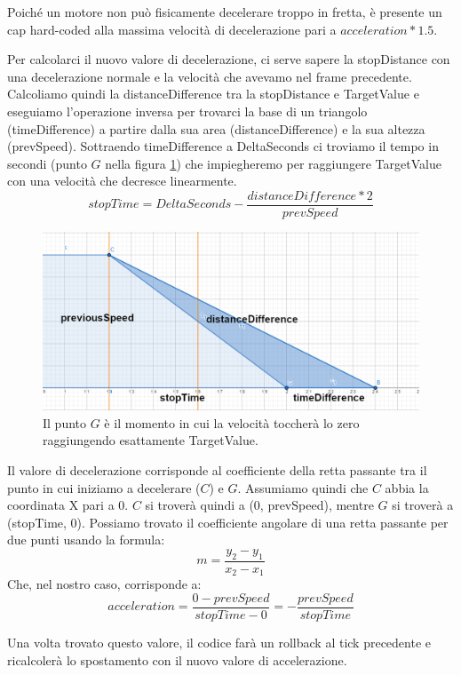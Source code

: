 \documentclass[main.tex]{subfiles}
\begin{document}
Poiché un motore non può fisicamente decelerare troppo in fretta, è presente un cap hard-coded alla massima velocità di decelerazione pari a $acceleration * 1.5$.

Per calcolarci il nuovo valore di decelerazione, ci serve sapere la stopDistance con una decelerazione normale e la velocità che avevamo nel frame precedente. Calcoliamo quindi la distanceDifference tra la stopDistance e TargetValue e eseguiamo l'operazione inversa per trovarci la base di un triangolo (timeDifference) a partire dalla sua area (distanceDifference) e la sua altezza (prevSpeed). Sottraendo timeDifference a DeltaSeconds ci troviamo il tempo in secondi (punto $G$ nella figura \ref{fig:4_OverrideDecelTimeDiff}) che impiegheremo per raggiungere TargetValue con una velocità che decresce linearmente.
\[stopTime = DeltaSeconds - \frac{distanceDifference * 2}{prevSpeed}\]
\begin{figure}[H]
    \centering
    \includegraphics[width=.95\linewidth]{img/interpolazione/OverrideDecelTimeDiff.png}
    \caption{Il punto $G$ è il momento in cui la velocità toccherà lo zero raggiungendo esattamente TargetValue.}
    \label{fig:4_OverrideDecelTimeDiff}
\end{figure}
\clearpage %
\noindent Il valore di decelerazione corrisponde al coefficiente della retta passante tra il punto in cui iniziamo a decelerare ($C$) e $G$. Assumiamo quindi che $C$ abbia la coordinata X pari a 0. $C$ si troverà quindi a (0, prevSpeed), mentre $G$ si troverà a (stopTime, 0). Possiamo trovato il coefficiente angolare di una retta passante per due punti usando la formula:
\[m = \frac{y_2 - y_1}{x_2 - x_1}\]
Che, nel nostro caso, corrisponde a:
\[acceleration = \frac{0 - prevSpeed}{stopTime - 0} = -\frac{prevSpeed}{stopTime}\]

Una volta trovato questo valore, il codice farà un rollback al tick precedente e ricalcolerà lo spostamento  con il nuovo valore di accelerazione.
\end{document}
